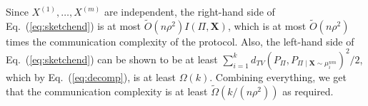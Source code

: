 \documentclass[final, 12pt]{colt2018}
\renewcommand{\eqref}[1]{Eq.~(\ref{#1})}
\newcommand{\thmref}[1]{Thm.~\ref{#1}}
\begin{document}
Since $X^{(1)}, \dots, X^{(m)}$ are independent, the right-hand side of \eqref{eq:sketchend} is at most $\tilde{O}(n\rho^2)I(\Pi,\mathbf{X})$, which is at most $\tilde{O}(n\rho^2)$ times the communication complexity of the protocol. Also, the left-hand side of \eqref{eq:sketchend} can be shown to be at least $\sum_{i=1}^{k}d_{TV}(P_{\Pi},P_{\Pi \mid \mathbf{X} \sim \mu_i^{nm}})^2/2$, which by \eqref{eq:decomp}, is at least $\Omega(k)$. Combining everything, we get that the communication complexity is at least $\tilde{\Omega}\left(k/\left(n\rho^2\right)\right)$ as required.

\end{document}
